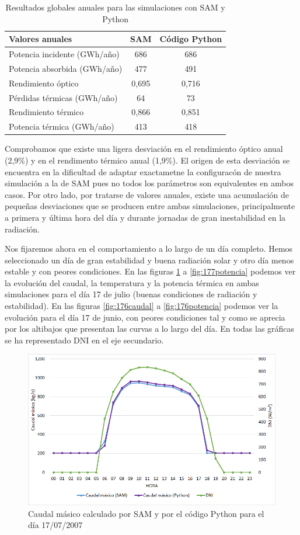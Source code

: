 \begin{table}[H]
\centering
\caption{Resultados globales anuales para las simulaciones con SAM y Python}
\label{tab:generacion_anual}
\begin{tabular}{lcc}
Valores anuales  & SAM & Código Python \\ \hline
Potencia incidente (GWh/año)	& 686		& 686			\\ 
Potencia absorbida (GWh/año)	& 477		& 491			\\ 
Rendimiento óptico 			& 0,695	 	& 0,716			\\ 
Pérdidas térmicas (GWh/año)	& 64		& 73			\\ 
Rendimiento térmico			& 0,866		& 0,851			\\ 
Potencia térmica (GWh/año) 	& 413		& 418	        	\\ 
\end{tabular}
\end{table}

Comprobamos que existe una ligera desviación en el rendimiento óptico anual (2,9\%) y en el rendimento térmico anual (1,9\%). El origen de esta desviación se encuentra en la dificultad de adaptar exactametne la configuracón de nuestra simulación a la de SAM pues no todos los parámetros son equivalentes en ambos casos. Por otro lado, por tratarse de valores anuales, existe una acumulación de pequeñas desviaciones que se producen entre ambas simulaciones, principalmente a primera y última hora del día  y durante jornadas de gran inestabilidad en la radiación. 

Nos fijaremos ahora en el comportamiento a lo largo de un día completo. Hemos seleccionado un día de gran estabilidad y buena radiación solar y otro día menos estable y con peores condiciones. En las figuras \ref{fig:177caudal}  a \ref{fig:177potencia} podemos ver la evolución del caudal, la temperatura y la potencia térmica en ambas simulaciones para el día 17 de julio (buenas condiciones de radiación y estabilidad). En las figuras \ref{fig:176caudal}  a \ref{fig:176potencia} podemos ver la evolución para el día 17 de junio, con peores condiciones tal y como se aprecia por los altibajos que presentan las curvas a lo largo del día. En todas las gráficas se ha representado DNI en el eje secundario.

\begin{figure}[H]
\includegraphics[width=0.9\linewidth]{images/177caudal.png}
\caption{Caudal másico calculado por SAM y por el código Python para el día 17/07/2007} 
\label{fig:177caudal}
\end{figure}

